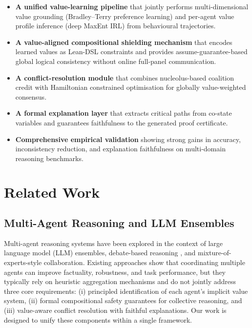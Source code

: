 \documentclass[12pt,a4paper]{article}
\begin{document}
\begin{itemize}[leftmargin=*,label=\textbullet]
  \item \textbf{A unified value-learning pipeline} that jointly performs
  multi-dimensional value grounding (Bradley--Terry preference learning) and per-agent
  value profile inference (deep MaxEnt IRL) from behavioural trajectories.
  \item \textbf{A value-aligned compositional shielding mechanism} that encodes learned
  values as Lean-DSL constraints and provides assume-guarantee-based global logical
  consistency without online full-panel communication.
  \item \textbf{A conflict-resolution module} that combines nucleolus-based coalition
  credit with Hamiltonian constrained optimisation for globally value-weighted consensus.
  \item \textbf{A formal explanation layer} that extracts critical paths from co-state
  variables and guarantees faithfulness to the generated proof certificate.
  \item \textbf{Comprehensive empirical validation} showing strong gains in accuracy,
  inconsistency reduction, and explanation faithfulness on multi-domain reasoning
  benchmarks.
\end{itemize}


\section{Related Work}
\label{sec:related}

\subsection{Multi-Agent Reasoning and LLM Ensembles}

Multi-agent reasoning systems have been explored in the context of large language model
(LLM) ensembles, debate-based reasoning \citep{du2023improving}, and
mixture-of-experts-style collaboration. Existing approaches show that coordinating
multiple agents can improve factuality, robustness, and task performance, but they
typically rely on heuristic aggregation mechanisms and do not jointly address three
core requirements: (i) principled identification of each agent's implicit value system,
(ii) formal compositional safety guarantees for collective reasoning, and
(iii) value-aware conflict resolution with faithful explanations. Our work is designed
to unify these components within a single framework.
\end{document}
